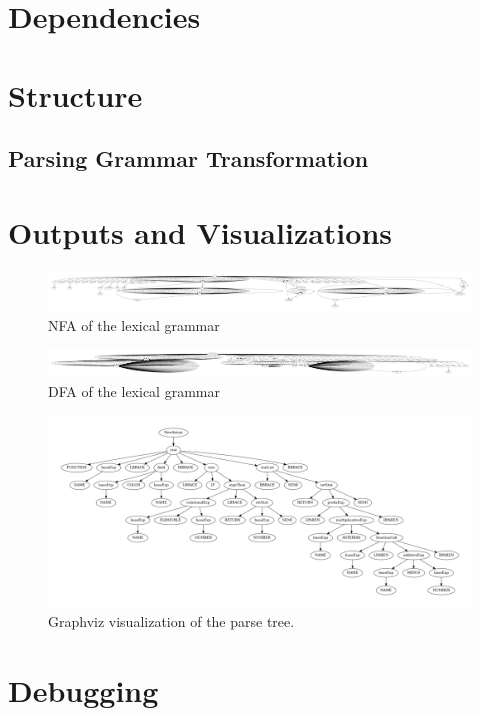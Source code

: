 \section{Dependencies} \label{dependancies}
\section{Structure} \label{structure}
\subsection{Parsing Grammar Transformation} \label{parsing_grammar_transformation}
\section{Outputs and Visualizations} \label{outputs_and_visualizations}

\begin{figure}[t]
\includegraphics[width=\linewidth]{images/nfa.png}
\caption{NFA of the lexical grammar}
\label{fig:compiler}
\end{figure}

\begin{figure}[t]
\includegraphics[width=\linewidth]{images/dfa.png}
\caption{DFA of the lexical grammar}
\label{fig:compiler}
\end{figure}

\begin{figure}[t]
\includegraphics[width=\linewidth]{images/ptree.png}
\caption{Graphviz visualization of the parse tree.}
\label{fig:compiler}
\end{figure}

\section{Debugging} \label{debugging}
